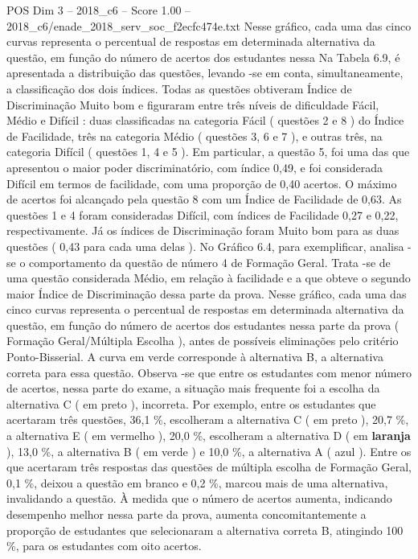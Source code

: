 \begin{textsample}{POS Dim 3 – 2018\_c6 – Score 1.00 – 2018\_c6/enade\_2018\_serv\_soc\_f2ecfc474e.txt}
Nesse gráfico, cada uma das cinco curvas representa o percentual de respostas em determinada alternativa da questão, em função do número de acertos dos estudantes nessa Na Tabela 6.9, é apresentada a distribuição das questões, levando -se em conta, simultaneamente, a classificação dos dois índices.
Todas as questões obtiveram Índice de Discriminação Muito bom e figuraram entre três níveis de dificuldade Fácil, Médio e Difícil : duas classificadas na categoria Fácil ( questões 2 e 8 ) do Índice de Facilidade, três na categoria Médio ( questões 3, 6 e 7 ), e outras três, na categoria Difícil ( questões 1, 4 e 5 ).
Em particular, a questão 5, foi uma das que apresentou o maior poder discriminatório, com índice 0,49, e foi considerada Difícil em termos de facilidade, com uma proporção de 0,40 acertos.
O máximo de acertos foi alcançado pela questão 8 com um Índice de Facilidade de 0,63.
As questões 1 e 4 foram consideradas Difícil, com índices de Facilidade 0,27 e 0,22, respectivamente.
Já os índices de Discriminação foram Muito bom para as duas questões ( 0,43 para cada uma delas ).
No Gráfico 6.4, para exemplificar, analisa -se o comportamento da questão de número 4 de Formação Geral.
Trata -se de uma questão considerada Médio, em relação à facilidade e a que obteve o segundo maior Índice de Discriminação dessa parte da prova.
Nesse gráfico, cada uma das cinco curvas representa o percentual de respostas em determinada alternativa da questão, em função do número de acertos dos estudantes nessa parte da prova ( Formação Geral/Múltipla Escolha ), antes de possíveis eliminações pelo critério Ponto-Bisserial.
A curva em verde corresponde à alternativa B, a alternativa correta para essa questão.
Observa -se que entre os estudantes com menor número de acertos, nessa parte do exame, a situação mais frequente foi a escolha da alternativa C ( em preto ), incorreta.
Por exemplo, entre os estudantes que acertaram três questões, 36,1 \%, escolheram a alternativa C ( em preto ), 20,7 \%, a alternativa E ( em vermelho ), 20,0 \%, escolheram a alternativa D ( em \textbf{laranja} ), 13,0 \%, a alternativa B ( em verde ) e 10,0 \%, a alternativa A ( azul ).
Entre os que acertaram três respostas das questões de múltipla escolha de Formação Geral, 0,1 \%, deixou a questão em branco e 0,2 \%, marcou mais de uma alternativa, invalidando a questão.
À medida que o número de acertos aumenta, indicando desempenho melhor nessa parte da prova, aumenta concomitantemente a proporção de estudantes que selecionaram a alternativa correta B, atingindo 100 \%, para os estudantes com oito acertos.

\end{textsample}
